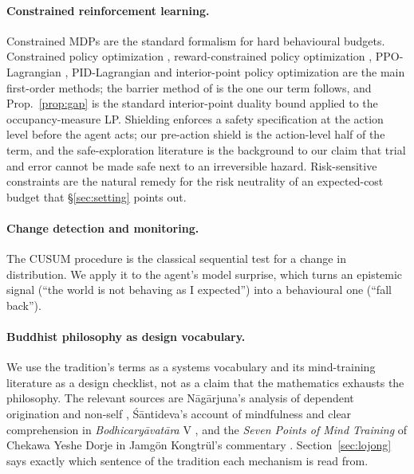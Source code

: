 \paragraph{Constrained reinforcement learning.}
Constrained MDPs \cite{altman1999cmdp} are the standard formalism for hard behavioural budgets.
Constrained policy optimization \cite{achiam2017cpo}, reward-constrained policy optimization \cite{tessler2019rcpo}, PPO-Lagrangian \cite{ray2019safety}, PID-Lagrangian \cite{stooke2020pid} and interior-point policy optimization \cite{liu2020ipo} are the main first-order methods; the barrier method of \cite{liu2020ipo} is the one our \Metta{} term follows, and Prop.~\ref{prop:gap} is the standard interior-point duality bound \cite{boyd2004convex} applied to the occupancy-measure LP.
Shielding \cite{alshiekh2018shielding} enforces a safety specification at the action level before the agent acts; our pre-action shield is the action-level half of the \Metta{} term, and the safe-exploration literature \cite{garcia2015survey} is the background to our claim that trial and error cannot be made safe next to an irreversible hazard.
Risk-sensitive constraints \cite{chow2018risk} are the natural remedy for the risk neutrality of an expected-cost budget that \S\ref{sec:setting} points out.

\paragraph{Change detection and monitoring.}
The CUSUM procedure \cite{page1954cusum} is the classical sequential test for a change in distribution.
We apply it to the agent's model surprise, which turns an epistemic signal (``the world is not behaving as I expected'') into a behavioural one (``fall back'').

\paragraph{Buddhist philosophy as design vocabulary.}
We use the tradition's terms as a systems vocabulary and its mind-training literature as a design checklist, not as a claim that the mathematics exhausts the philosophy.
The relevant sources are Nāgārjuna's analysis of dependent origination and non-self \cite{garfield1995}, Śāntideva's account of mindfulness and clear comprehension in \emph{Bodhicaryāvatāra} V \cite{santideva1995}, and the \emph{Seven Points of Mind Training} of Chekawa Yeshe Dorje in Jamgön Kongtrül's commentary \cite{kongtrul1987}.
Section~\ref{sec:lojong} says exactly which sentence of the tradition each mechanism is read from.
